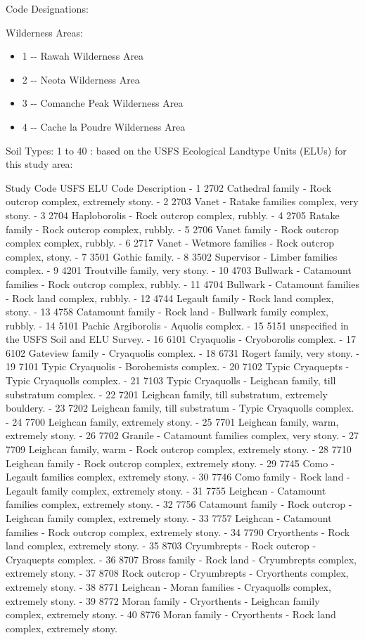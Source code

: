\documentclass[11pt]{article}
\providecommand{\tightlist}{%
      \setlength{\itemsep}{0pt}\setlength{\parskip}{0pt}}
\begin{document}
Code Designations:

Wilderness Areas:

\begin{itemize}
\tightlist
\item
  1 -\/- Rawah Wilderness Area
\item
  2 -\/- Neota Wilderness Area
\item
  3 -\/- Comanche Peak Wilderness Area
\item
  4 -\/- Cache la Poudre Wilderness Area
\end{itemize}

Soil Types: 1 to 40 : based on the USFS Ecological Landtype Units (ELUs)
for this study area:

Study Code USFS ELU Code Description - 1 2702 Cathedral family - Rock
outcrop complex, extremely stony. - 2 2703 Vanet - Ratake families
complex, very stony. - 3 2704 Haploborolis - Rock outcrop complex,
rubbly. - 4 2705 Ratake family - Rock outcrop complex, rubbly. - 5 2706
Vanet family - Rock outcrop complex complex, rubbly. - 6 2717 Vanet -
Wetmore families - Rock outcrop complex, stony. - 7 3501 Gothic family.
- 8 3502 Supervisor - Limber families complex. - 9 4201 Troutville
family, very stony. - 10 4703 Bullwark - Catamount families - Rock
outcrop complex, rubbly. - 11 4704 Bullwark - Catamount families - Rock
land complex, rubbly. - 12 4744 Legault family - Rock land complex,
stony. - 13 4758 Catamount family - Rock land - Bullwark family complex,
rubbly. - 14 5101 Pachic Argiborolis - Aquolis complex. - 15 5151
unspecified in the USFS Soil and ELU Survey. - 16 6101 Cryaquolis -
Cryoborolis complex. - 17 6102 Gateview family - Cryaquolis complex. -
18 6731 Rogert family, very stony. - 19 7101 Typic Cryaquolis -
Borohemists complex. - 20 7102 Typic Cryaquepts - Typic Cryaquolls
complex. - 21 7103 Typic Cryaquolls - Leighcan family, till substratum
complex. - 22 7201 Leighcan family, till substratum, extremely bouldery.
- 23 7202 Leighcan family, till substratum - Typic Cryaquolls complex. -
24 7700 Leighcan family, extremely stony. - 25 7701 Leighcan family,
warm, extremely stony. - 26 7702 Granile - Catamount families complex,
very stony. - 27 7709 Leighcan family, warm - Rock outcrop complex,
extremely stony. - 28 7710 Leighcan family - Rock outcrop complex,
extremely stony. - 29 7745 Como - Legault families complex, extremely
stony. - 30 7746 Como family - Rock land - Legault family complex,
extremely stony. - 31 7755 Leighcan - Catamount families complex,
extremely stony. - 32 7756 Catamount family - Rock outcrop - Leighcan
family complex, extremely stony. - 33 7757 Leighcan - Catamount families
- Rock outcrop complex, extremely stony. - 34 7790 Cryorthents - Rock
land complex, extremely stony. - 35 8703 Cryumbrepts - Rock outcrop -
Cryaquepts complex. - 36 8707 Bross family - Rock land - Cryumbrepts
complex, extremely stony. - 37 8708 Rock outcrop - Cryumbrepts -
Cryorthents complex, extremely stony. - 38 8771 Leighcan - Moran
families - Cryaquolls complex, extremely stony. - 39 8772 Moran family -
Cryorthents - Leighcan family complex, extremely stony. - 40 8776 Moran
family - Cryorthents - Rock land complex, extremely stony.
\end{document}
